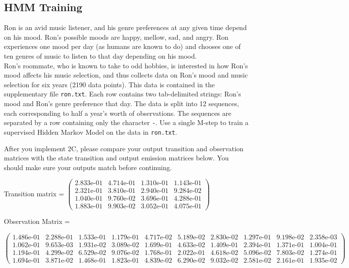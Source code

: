 \subsection{HMM Training}
Ron is an avid music listener, and his genre preferences at any given time depend on his mood. Ron's possible moods are happy, mellow, sad, and angry. Ron experiences one mood per day (as humans are known to do) and chooses one of ten genres of music to listen to that day depending on his mood. \\

Ron's roommate, who is known to take to odd hobbies, is interested in how Ron's mood affects his music selection, and thus collects data on Ron's mood and music selection for six years (2190 data points). This data is contained in the supplementary file \texttt{ron.txt}. Each row contains two tab-delimited strings: Ron's mood and Ron's genre preference that day. The data is split into 12 sequences, each corresponding to half a year's worth of observations. The sequences are separated by a row containing only the character \texttt{-}.
\noindent\problem[10] %
Use a single M-step to train a supervised Hidden Markov Model on the data in \texttt{ron.txt}.

After you implement 2C, please compare your output transition and observation matrices with the state transition and output emission matrices below. You should make sure your outputs match before continuing.

Transition matrix = \small $\begin{pmatrix}
    2.833\text{e-}01 & 4.714\text{e-}01 & 1.310\text{e-}01 & 1.143\text{e-}01 \\
    2.321\text{e-}01 & 3.810\text{e-}01 & 2.940\text{e-}01 & 9.284\text{e-}02 \\
    1.040\text{e-}01 & 9.760\text{e-}02 & 3.696\text{e-}01 & 4.288\text{e-}01 \\
    1.883\text{e-}01 & 9.903\text{e-}02 & 3.052\text{e-}01 & 4.075\text{e-}01 
\end{pmatrix}$
\normalsize

Observation Matrix =

\small
$\begin{pmatrix}
1.486\text{e-}01 & 2.288\text{e-}01 & 1.533\text{e-}01 & 1.179\text{e-}01 & 4.717\text{e-}02 & 5.189\text{e-}02 & 2.830\text{e-}02 & 1.297\text{e-}01 & 9.198\text{e-}02 & 2.358\text{e-}03 \\
1.062\text{e-}01 & 9.653\text{e-}03 & 1.931\text{e-}02 & 3.089\text{e-}02 & 1.699\text{e-}01 & 4.633\text{e-}02 & 1.409\text{e-}01 & 2.394\text{e-}01 & 1.371\text{e-}01 & 1.004\text{e-}01 \\
1.194\text{e-}01 & 4.299\text{e-}02 & 6.529\text{e-}02 & 9.076\text{e-}02 & 1.768\text{e-}01 & 2.022\text{e-}01 & 4.618\text{e-}02 & 5.096\text{e-}02 & 7.803\text{e-}02 & 1.274\text{e-}01 \\
1.694\text{e-}01 & 3.871\text{e-}02 & 1.468\text{e-}01 & 1.823\text{e-}01 & 4.839\text{e-}02 & 6.290\text{e-}02 & 9.032\text{e-}02 & 2.581\text{e-}02 & 2.161\text{e-}01 & 1.935\text{e-}02 
\end{pmatrix}$
\normalsize
\medskip

